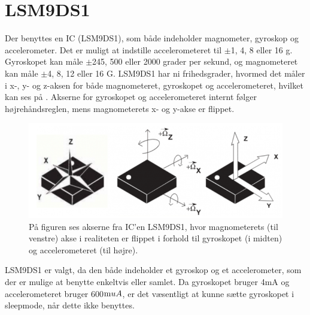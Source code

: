 \section{LSM9DS1}
Der benyttes en IC (LSM9DS1), som både indeholder magnometer, gyroskop og accelerometer. Det er muligt at indstille accelerometeret til $\pm$1, 4, 8 eller 16 g. Gyroskopet kan måle $\pm$245, 500 eller 2000 grader per sekund, og magnometeret kan måle $\pm$4, 8, 12 eller 16 G.\citep{Jimb02016} \newline
LSM9DS1 har ni frihedsgrader, hvormed det måler i x-, y- og z-aksen for både magnometeret, gyroskopet og accelerometeret, hvilket kan ses på . Akserne for gyroskopet og accelerometeret internt følger højrehåndsreglen, mens magnometerets x- og y-akse er flippet.\citep{Jimb02016}

\begin{figure}[H]
	\centering
	\includegraphics[scale=0.6]{figures/cDesign/LSM9DS1.png}
	\caption{På figuren ses akserne fra IC'en LSM9DS1, hvor magnometerets (til venstre) akse i realiteten er flippet i forhold til gyroskopet (i midten) og accelerometeret (til højre).\citep{Jimb02016}}
	\label{fig:sensor_placering}
\end{figure}

LSM9DS1 er valgt, da den både indeholder et gyroskop og et accelerometer, som der er mulige at benytte enkeltvis eller samlet. Da gyroskopet bruger 4mA og accelerometeret bruger 600$\text muA$, er det væsentligt at kunne sætte gyroskopet i sleepmode, når dette ikke benyttes. 